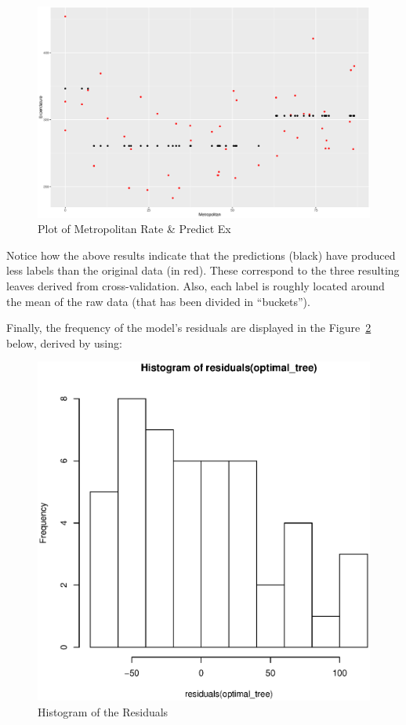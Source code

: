\documentclass[a4paper,12pt]{article}
\begin{document}
        \begin{figure}[H]
            \centering
            \caption{Plot of Metropolitan Rate \& Predict Ex}
            \label{fig:predicted}
            \includegraphics[width=\textwidth]{share/A1_fit.eps}
        \end{figure}

        Notice how the above results indicate that the predictions (black) have produced less labels than the original data (in red). These correspond to the three resulting leaves derived from cross-validation. Also, each label is roughly located around the mean of the raw data (that has been divided in ``buckets'').

        Finally, the frequency of the model's residuals are displayed in the Figure~\ref{fig:residuals} below, derived by using:

        

        \begin{figure}[H]
            \centering
            \caption{Histogram of the Residuals}
            \label{fig:residuals}
            \includegraphics[width=\textwidth]{share/A1_historgram_residuals.eps}
        \end{figure}
\end{document}
